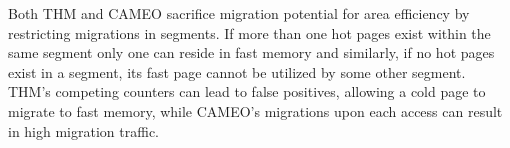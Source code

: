 Both THM and CAMEO sacrifice migration potential for area efficiency by restricting migrations in segments. If more than one hot pages exist within the same segment only one can reside in fast memory and similarly, if no hot pages exist in a segment, its fast page cannot be utilized by some other segment. THM's competing counters can lead to false positives, allowing a cold page to migrate to fast memory, while CAMEO's migrations upon each access can result in high migration traffic.